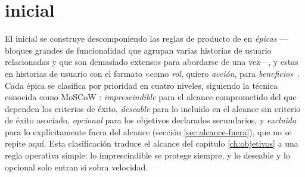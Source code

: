 \section{ inicial}
\label{sec:backlog}

El  inicial se construye descomponiendo las reglas de producto de \bukit en \emph{épicas} —bloques grandes de funcionalidad que agrupan varias historias de usuario relacionadas y que son demasiado extensos para abordarse de una vez—, y estas en historias de usuario con el formato «como \emph{rol}, quiero \emph{acción}, para \emph{beneficio}» \parencite{cohn-user-stories}.
Cada épica se clasifica por prioridad en cuatro niveles, siguiendo la técnica conocida como MoSCoW \parencite{clegg-moscow}: \emph{imprescindible} para el alcance comprometido del que dependen los criterios de éxito, \emph{deseable} para lo incluido en el alcance sin criterio de éxito asociado, \emph{opcional} para los objetivos declarados secundarios, y \emph{excluida} para lo explícitamente fuera del alcance (sección \ref{sec:alcance-fuera}), que no se repite aquí.
Esta clasificación traduce el alcance del capítulo \ref{ch:objetivos} a una regla operativa simple: lo imprescindible se protege siempre, y lo deseable y lo opcional solo entran si sobra velocidad.

